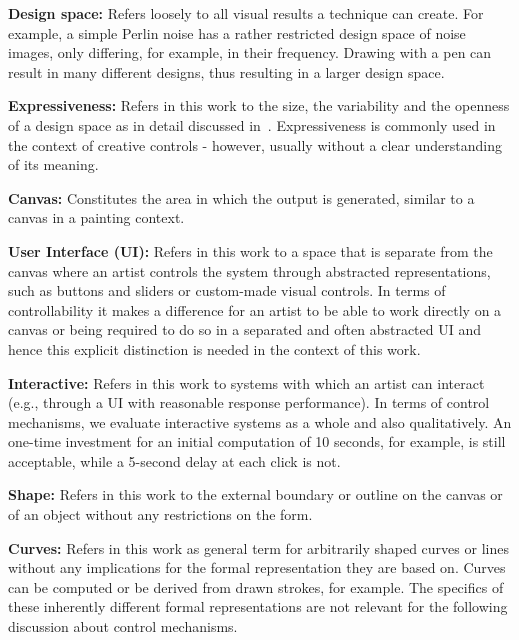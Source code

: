 \textbf{Design space:} Refers loosely to all visual results a technique can create. For example, a simple Perlin noise has a rather restricted design space of noise images, only differing, for example, in their frequency. Drawing with a pen can result in many different designs, thus resulting in a larger design space.

\textbf{Expressiveness:} Refers in this work to the size, the variability and the openness of a design space as in detail discussed in~. Expressiveness is commonly used in the context of creative controls - however, usually without a clear understanding of its meaning.


\textbf{Canvas:} Constitutes the area in which the output is generated, similar to a canvas in a painting context.

\textbf{User Interface (UI):} Refers in this work to a space that is separate from the canvas where an artist controls the system through abstracted representations, such as buttons and sliders or custom-made visual controls. In terms of controllability it makes a difference for an artist to be able to work directly on a canvas or being required to do so in a separated and often abstracted UI and hence this explicit distinction is needed in the context of this work.

\textbf{Interactive:} Refers in this work to systems with which an artist can interact (e.g., through a UI with reasonable response performance). In terms of control mechanisms, we evaluate interactive systems as a whole and also qualitatively. An one-time investment for an initial computation of 10 seconds, for example, is still acceptable, while a 5-second delay at each click is not.

\textbf{Shape:} Refers in this work to the external boundary or outline on the canvas or of an object without any restrictions on the form. 

\textbf{Curves:} Refers in this work as general term for arbitrarily shaped curves or lines without any implications for the formal representation they are based on. Curves can be computed or be derived from drawn strokes, for example. The specifics of these inherently different formal representations are not relevant for the following discussion about control mechanisms.

